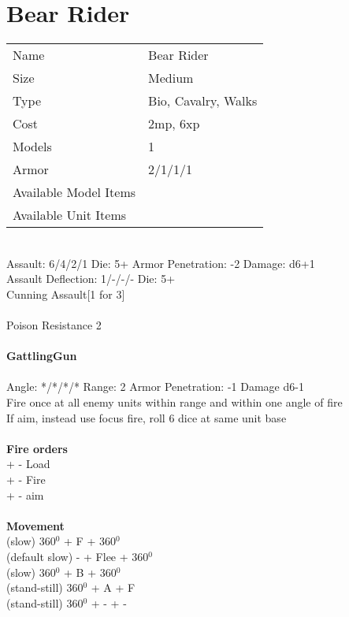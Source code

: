 






\pagebreak

\section{ Bear Rider }

\begin{tabular}{ll}
  Name & Bear Rider \\
  Size & Medium\\
  Type & Bio, Cavalry, Walks\\
  Cost & 2mp, 6xp\\
  Models & 1\\
  Armor & 2/1/1/1\\
  Available Model Items &  \\
  Available Unit Items &  \\
\end{tabular}

\ \\
Assault: 6/4/2/1 Die: 5+ Armor Penetration: -2 Damage: d6+1 \\
Assault Deflection: 1/-/-/- Die: 5+\\
\indent Cunning Assault[1 for 3] \\
\ \\
Poison Resistance 2
\ \\
\ \\
{\bf GattlingGun } \\
\ \\
Angle: */*/*/* Range: 2 Armor Penetration: -1 Damage d6-1 \\
\indent Fire once at all enemy units within range and within one angle of fire \\ If aim, instead use focus fire, roll 6 dice at same unit base \\





\ \\ {\bf Fire orders } \\
+ - Load \\
+ - Fire \\
+ - aim \\
\ \\ {\bf Movement } \\
(slow) 360$^0$ + F + 360$^0$ \\
(default slow) - + Flee + 360$^0$ \\
(slow) 360$^0$ + B + 360$^0$ \\
(stand-still) 360$^0$ + A + F \\
(stand-still) 360$^0$ + - + - \\



